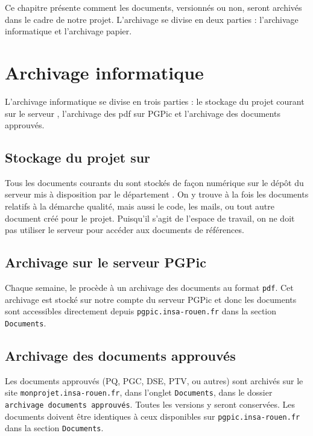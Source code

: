 
Ce chapitre présente comment les documents, versionnés ou non, seront archivés dans le cadre de notre projet. L’archivage se divise en deux parties : l’archivage informatique et l’archivage papier.

\section{Archivage informatique}

L'archivage informatique se divise en trois parties : le stockage du projet courant sur le serveur \git{}, l'archivage des pdf sur PGPic et l'archivage des documents approuvés.

\subsection{Stockage du projet sur \git{}}
Tous les documents courants du \PICCourt sont stockés de façon numérique sur le dépôt du serveur \git{} mis à disposition par le département \ASI{}. On y trouve à la fois les documents relatifs à la démarche qualité, mais aussi le code, les mails, ou tout autre document créé pour le projet. Puisqu'il s'agit de l'espace de travail, on ne doit pas utiliser le serveur \git{} pour accéder aux documents de références.

\subsection{Archivage sur le serveur PGPic}

Chaque semaine, le \RQ{} procède à un archivage des documents au format \verb+pdf+. Cet archivage est stocké sur notre compte du serveur PGPic et donc les documents sont accessibles directement depuis \verb+pgpic.insa-rouen.fr+ dans la section \verb+Documents+.

\subsection{Archivage des documents approuvés}

Les documents approuvés (PQ, PGC, DSE, PTV, ou autres) sont archivés sur le site \verb+monprojet.insa-rouen.fr+, dans l'onglet \verb+Documents+, dans le dossier \verb+archivage documents approuvés+. Toutes les versions y seront conservées. Les documents doivent être identiques à ceux disponibles sur \verb+pgpic.insa-rouen.fr+ dans la section \verb+Documents+.



